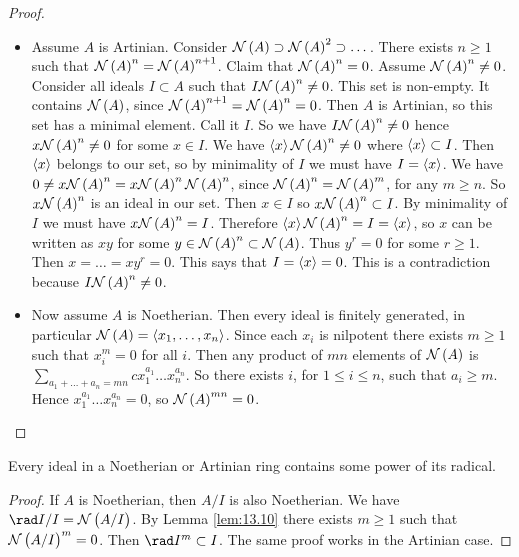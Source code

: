 \begin{proof}
\hfill
\begin{itemize}
\item Assume $ A $ is Artinian. Consider $ \NNN\br{A} \supset \NNN\br{A}^2 \supset \dots $. There exists $ n \ge 1 $ such that $ \NNN\br{A}^n = \NNN\br{A}^{n + 1} $. Claim that $ \NNN\br{A}^n = 0 $. Assume $ \NNN\br{A}^n \ne 0 $. Consider all ideals $ I \subset A $ such that $ I\NNN\br{A}^n \ne 0 $. This set is non-empty. It contains $ \NNN\br{A} $, since $ \NNN\br{A}^{n + 1} = \NNN\br{A}^n = 0 $. Then $ A $ is Artinian, so this set has a minimal element. Call it $ I $. So we have $ I\NNN\br{A}^n \ne 0 $ hence $ x\NNN\br{A}^n \ne 0 $ for some $ x \in I $. We have $ \abr{x}\NNN\br{A}^n \ne 0 $ where $ \left\langle x \right\rangle \subset I $. Then $ \left\langle x \right\rangle $ belongs to our set, so by minimality of $ I $ we must have $ I = \left\langle x \right\rangle $. We have $ 0 \ne x\NNN\br{A}^n = x\NNN\br{A}^n\NNN\br{A}^n $, since $ \NNN\br{A}^n = \NNN\br{A}^m $, for any $ m \ge n $. So $ x\NNN\br{A}^n $ is an ideal in our set. Then $ x \in I $ so $ x\NNN\br{A}^n \subset I $. By minimality of $ I $ we must have $ x\NNN\br{A}^n = I $. Therefore $ \abr{x}\NNN\br{A}^n = I = \abr{x} $, so $ x $ can be written as $ xy $ for some $ y \in \NNN\br{A}^n \subset \NNN\br{A} $. Thus $ y^r = 0 $ for some $ r \ge 1 $. Then $ x = \dots = xy^r = 0 $. This says that $ I = \left\langle x \right\rangle = 0 $. This is a contradiction because $ I\NNN\br{A}^n \ne 0 $.
\item Now assume $ A $ is Noetherian. Then every ideal is finitely generated, in particular $ \NNN\br{A} = \abr{x_1, \dots, x_n} $. Since each $ x_i $ is nilpotent there exists $ m \ge 1 $ such that $ x_i^m = 0 $ for all $ i $. Then any product of $ mn $ elements of $ \NNN\br{A} $ is $ \sum_{a_1 + \dots + a_n = mn} cx_1^{a_1} \dots x_n^{a_n} $. So there exists $ i $, for $ 1 \le i \le n $, such that $ a_i \ge m $. Hence $ x_1^{a_1} \dots x_n^{a_n} = 0 $, so $ \NNN\br{A}^{mn} = 0 $.
\end{itemize}
\end{proof}


\begin{corollary}
\label{cor:13.11}
Every ideal in a Noetherian or Artinian ring contains some power of its radical.
\end{corollary}

\begin{proof}
If $ A $ is Noetherian, then $ A / I $ is also Noetherian. We have $ \rad I / I = \NNN\br{A / I} $. By Lemma \ref{lem:13.10} there exists $ m \ge 1 $ such that $ \NNN\br{A / I}^m = 0 $. Then $ \rad I^m \subset I $. The same proof works in the Artinian case.
\end{proof}

